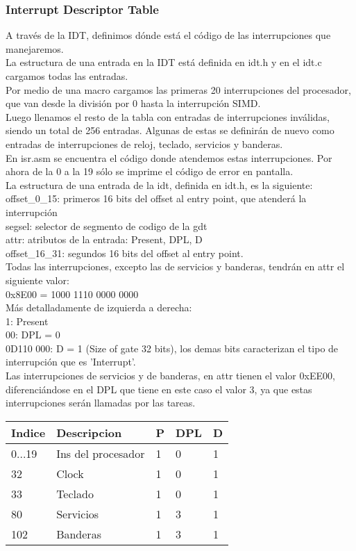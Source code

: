 \subsubsection{Interrupt Descriptor Table}
A trav\'es de la IDT, definimos d\'onde est\'a el c\'odigo de las interrupciones que manejaremos.\\
La estructura de una entrada en la IDT est\'a definida en idt.h y en el idt.c cargamos todas las entradas.\\
Por medio de una macro cargamos las primeras 20 interrupciones del procesador, que van desde la divisi\'on por 0 hasta la interrupci\'on SIMD.\\
Luego llenamos el resto de la tabla con entradas de interrupciones inv\'alidas, siendo un total de 256 entradas. Algunas de estas se definir\'an de nuevo como entradas de interrupciones de reloj, teclado, servicios y banderas.\\
En isr.asm se encuentra el c\'odigo donde atendemos estas interrupciones. Por ahora de la 0 a la 19 s\'olo se imprime el c\'odigo de error en pantalla.\\

La estructura de una entrada de la idt, definida en idt.h, es la siguiente:\\
offset\_0\_15: primeros 16 bits del offset al entry point, que atender\'a la interrupci\'on\\
segsel: selector de segmento de codigo de la gdt\\
attr: atributos de la entrada: Present, DPL, D\\
offset\_16\_31: segundos 16 bits del offset al entry point.\\

Todas las interrupciones, excepto las de servicios y banderas, tendr\'an en attr el siguiente valor:\\
0x8E00 = 1000 1110 0000 0000\\
Más detalladamente de izquierda a derecha:\\
1: Present\\
00: DPL = 0\\
0D110 000: D = 1 (Size of gate 32 bits), los demas bits caracterizan el tipo de interrupci\'on que es 'Interrupt'.\\

Las interrupciones de servicios y de banderas, en attr tienen el valor 0xEE00, diferenci\'andose en el DPL que tiene en este caso el valor 3, ya que estas interrupciones ser\'an llamadas por las tareas.\\

\begin{tabular}{l l l l l}
Indice & Descripcion & P & DPL & D\\

\hline
0...19 & Ins del procesador & 1 & 0 & 1 \\
32 & Clock & 1 & 0 & 1\\
33 & Teclado	 & 1 & 0 & 1\\
80 & Servicios & 1 & 3 & 1\\
102 & Banderas & 1 & 3 & 1\\
\end{tabular}




